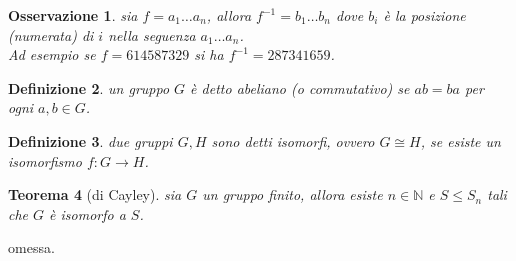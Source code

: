 \documentclass[oneside, 11pt]{amsbook}
\makeatletter
\newcommand{\0}{{(0)}}
\newcommand{\3}{{(3)}}
\theoremstyle{colonplain}
\newtheorem{thm}{Teorema}[chapter]
\theoremstyle{colondefinition}
\newtheorem{defn}[thm]{Definizione}
\theoremstyle{colonremark}
\newtheorem{rmk}[thm]{Osservazione}
\numberwithin{equation}{chapter}
\renewcommand{\proofname}{Dimostrazione}
\renewenvironment{proof}[1][\proofname]{\par
  \pushQED{\qed}%
  \normalfont \topsep6\p@\@plus6\p@\relax
  \trivlist
  \item[\hskip\labelsep\bfseries #1:]\ignorespaces
}{%
  \popQED\endtrivlist\@endpefalse
}
\makeatother
\begin{document}
\begin{rmk}
sia $f = a_1 \dots a_n$, allora $f^{-1} = b_1 \dots b_n$ dove $b_i$ è la posizione (numerata) di $i$ nella seguenza $a_1 \dots a_n$. \\
Ad esempio se $f = 614587329$ si ha $f^{-1} = 287341659$.
\end{rmk}
\begin{defn}
un gruppo $G$ è detto \textit{abeliano} (o \textit{commutativo}) se $ab = ba$ per ogni $a, b \in G$.
\end{defn}
\begin{defn}
due gruppi $G, H$ sono detti \textit{isomorfi}, ovvero $G \cong H$, se esiste un isomorfismo $f : G \longrightarrow H$.
\end{defn}
\begin{thm}[di Cayley]
sia $G$ un gruppo finito, allora esiste $n \in \mathbb{N}$ e $S \leq S_n$ tali che $G$ è isomorfo a $S$.
\end{thm}
\begin{proof}
omessa.
\end{proof}
\end{document}

